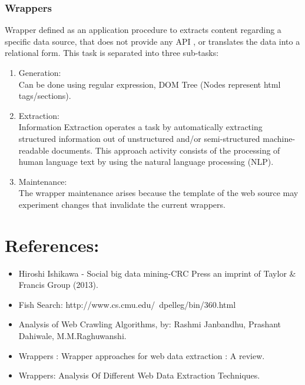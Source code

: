 \documentclass[12pt, a4paper]{report}
\begin{document}
\subsubsection{Wrappers}
 Wrapper defined as an application procedure to extracts content regarding a specific data source, that does not provide any API , or translates the data into a relational form. This task is separated into three sub-tasks:
\begin{enumerate}
    \item Generation:\\
        Can be done using regular expression, DOM Tree (Nodes represent html tags/sections).
    \item Extraction:\\
    Information Extraction operates a task by automatically extracting structured information out of unstructured and/or semi-structured machine-readable documents. This approach activity consists of the processing of human language text by using the natural language processing (NLP).
    \item Maintenance:\\
    The wrapper maintenance arises because the template of the web source may experiment changes that invalidate the current wrappers. 
\end{enumerate}









\section{References:}
\begin{itemize}
    \item Hiroshi Ishikawa - Social big data mining-CRC Press an imprint of Taylor \& Francis Group (2013).
    \item Fish Search: http://www.cs.cmu.edu/~dpelleg/bin/360.html
    \item Analysis of Web Crawling Algorithms, by: Rashmi Janbandhu, Prashant Dahiwale, M.M.Raghuwanshi.
    \item Wrappers : Wrapper approaches for web data extraction : A review.
    \item Wrappers: Analysis Of Different Web Data Extraction Techniques.
    
\end{itemize}
\end{document}
